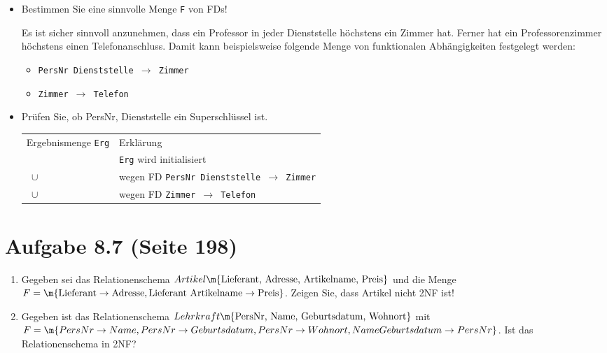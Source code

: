 \documentclass{bschlangaul-haupt}
\begin{document}
\begin{itemize}
\item Bestimmen Sie eine sinnvolle Menge \texttt{F} von FDs!

\begin{liAntwort}
Es ist sicher sinnvoll anzunehmen, dass ein Professor in jeder
Dienststelle höchstens ein Zimmer hat. Ferner hat ein Professorenzimmer
höchstens einen Telefonanschluss. Damit kann beispielsweise folgende
Menge von funktionalen Abhängigkeiten festgelegt werden:

\begin{itemize}
\item \texttt{PersNr Dienststelle $\rightarrow$ Zimmer}
\item \texttt{Zimmer $\rightarrow$ Telefon}
\end{itemize}
\end{liAntwort}

\item Prüfen Sie, ob {PersNr, Dienststelle} ein Superschlüssel ist.

\begin{liAntwort}
\footnotesize
\begin{tabular}{ll}
Ergebnismenge \texttt{Erg} &
Erklärung\\

\texttt{\m{PersNr, Dienststelle}} &
\texttt{Erg} wird initialisiert\\

\texttt{\m{PersNr, Dienststelle} $\cup$ \m{Zimmer}} &
wegen FD \texttt{PersNr Dienststelle $\rightarrow$ Zimmer}\\

\texttt{\m{PersNr, Dienststelle, Zimmer} $\cup$ \m{Telefon}} &
wegen FD \texttt{Zimmer $\rightarrow$ Telefon}\\
\end{tabular}

\end{liAntwort}

\end{itemize}

%

\section{Aufgabe 8.7 (Seite 198)}

\begin{enumerate}
\item Gegeben sei das Relationenschema
$Artikel\m{\textrm{Lieferant, Adresse, Artikelname, Preis}}$
und die Menge
$F = \m{\textrm{Lieferant} \rightarrow \textrm{Adresse}, \textrm{Lieferant Artikelname} \rightarrow \textrm{Preis} }$.
Zeigen Sie, dass Artikel nicht 2NF ist!

\item Gegeben ist das Relationenschema
$Lehrkraft\m{\textrm{PersNr, Name, Geburtsdatum, Wohnort}}$
mit
$F = \m{PersNr \rightarrow Name, PersNr \rightarrow Geburtsdatum, PersNr \rightarrow Wohnort, Name Geburtsdatum \rightarrow PersNr}$.
Ist das Relationenschema in 2NF?

\end{enumerate}
\end{document}
